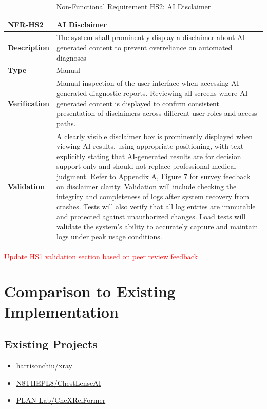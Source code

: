 \documentclass[12pt, titlepage]{article}
\begin{document}
\begin{table}[H]
\centering
{}
\begin{tabular}{|p{3.5cm}|p{11.5cm}|}
\hline
\rowcolor{gray!30}
\textbf{NFR-HS2} & \textbf{AI Disclaimer} \\
\hline
\textbf{Description} & The system shall prominently display a disclaimer about AI-generated content to prevent overreliance on automated diagnoses \\
\hline
\textbf{Type} & Manual \\
\hline
\textbf{Verification} & Manual inspection of the user interface when accessing AI-generated diagnostic reports. Reviewing all screens where AI-generated content is displayed to confirm consistent presentation of disclaimers across different user roles and access paths. \\
\hline
\textbf{Validation} & A clearly visible disclaimer box is prominently displayed when viewing AI results, using appropriate positioning, with text explicitly stating that AI-generated results are for decision support only and should not replace professional medical judgment. Refer to \hyperref[appendix:A]{Appendix A, Figure 7} for survey feedback on disclaimer clarity. Validation will include checking the integrity and completeness of logs after system recovery from crashes. Tests will also verify that all log entries are immutable and protected against unauthorized changes. Load tests will validate the system's ability to accurately capture and maintain logs under peak usage conditions.
\\
\hline
\end{tabular}
\caption{Non-Functional Requirement HS2: AI Disclaimer}
\textcolor{red}{Update HS1 validation section based on peer review feedback}
\end{table}

\clearpage
\newpage
\section{Comparison to Existing Implementation}	

\subsection{Existing Projects}
\begin{itemize}
    \item \href{https://github.com/harrisonchiu/xray/tree/main}{harrisonchiu/xray}
    \item \href{https://github.com/N8THEPL8/ChestLenseAI/tree/main}{N8THEPL8/ChestLenseAI}
    \item \href{https://github.com/PLAN-Lab/CheXRelFormer/tree/main}{PLAN-Lab/CheXRelFormer}
\end{itemize}
\end{document}
